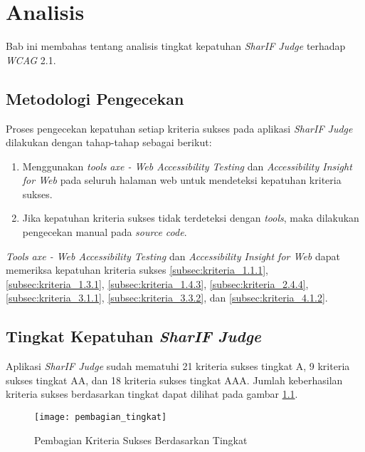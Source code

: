\chapter{Analisis}
\label{chap:analisis}

Bab ini membahas tentang analisis tingkat kepatuhan \textit{SharIF Judge} terhadap \textit{WCAG} 2.1. 


\section{Metodologi Pengecekan}
\label{sec:metodologi_pengecekan}
Proses pengecekan kepatuhan setiap kriteria sukses pada aplikasi \textit{SharIF Judge} dilakukan 
dengan tahap-tahap sebagai berikut: 

\begin{enumerate}
	\item Menggunakan \textit{tools} \textit{axe - Web Accessibility Testing} dan \textit{Accessibility Insight for Web} pada seluruh halaman web untuk mendeteksi kepatuhan kriteria sukses.
	\item Jika kepatuhan kriteria sukses tidak terdeteksi dengan \textit{tools}, maka dilakukan pengecekan manual pada \textit{source code}.
\end{enumerate}

\textit{Tools} \textit{axe - Web Accessibility Testing} dan \textit{Accessibility Insight for Web} dapat memeriksa kepatuhan kriteria sukses \ref{subsec:kriteria_1.1.1}, \ref{subsec:kriteria_1.3.1}, \ref{subsec:kriteria_1.4.3}, \ref{subsec:kriteria_2.4.4}, \ref{subsec:kriteria_3.1.1}, \ref{subsec:kriteria_3.3.2}, dan \ref{subsec:kriteria_4.1.2}.

\section{Tingkat Kepatuhan \textit{SharIF Judge}}
\label{sec:kepatuhan_sharif_judge_terhadap_wcag_2.1}
Aplikasi \textit{SharIF Judge} sudah mematuhi 21 kriteria sukses tingkat A, 9 kriteria sukses tingkat AA, dan 18 kriteria sukses tingkat AAA. Jumlah keberhasilan kriteria sukses berdasarkan tingkat dapat dilihat pada gambar \ref{fig:pembagian_kriteria_sukses_tingkat}.

\begin{figure}[H]
	\centering  
	\texttt{[image: pembagian\_tingkat]}  
	\caption[Pembagian Kriteria Sukses]{Pembagian Kriteria Sukses Berdasarkan Tingkat} 
	\label{fig:pembagian_kriteria_sukses_tingkat} 
\end{figure}

